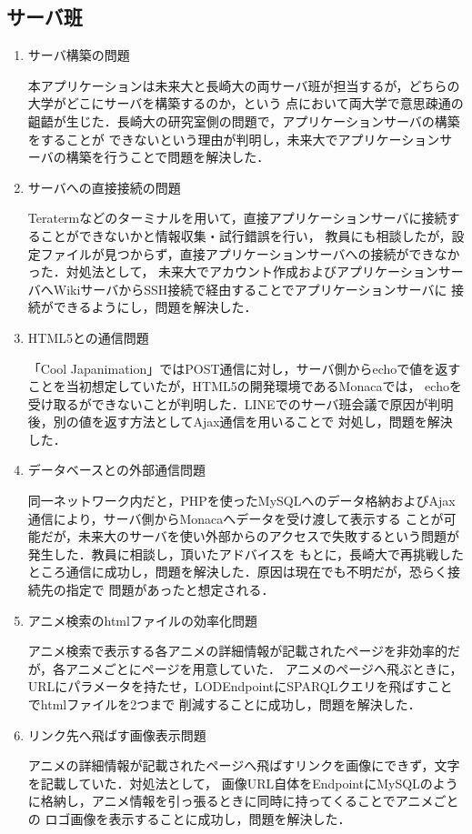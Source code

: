 \subsection{サーバ班}
\begin{enumerate}

\item サーバ構築の問題
\par
本アプリケーションは未来大と長崎大の両サーバ班が担当するが，どちらの大学がどこにサーバを構築するのか，という
点において両大学で意思疎通の齟齬が生じた．長崎大の研究室側の問題で，アプリケーションサーバの構築をすることが
できないという理由が判明し，未来大でアプリケーションサーバの構築を行うことで問題を解決した．

\item サーバへの直接接続の問題
\par
Teratermなどのターミナルを用いて，直接アプリケーションサーバに接続することができないかと情報収集・試行錯誤を行い，
教員にも相談したが，設定ファイルが見つからず，直接アプリケーションサーバへの接続ができなかった．対処法として，
未来大でアカウント作成およびアプリケーションサーバへWikiサーバからSSH接続で経由することでアプリケーションサーバに
接続ができるようにし，問題を解決した．

\item HTML5との通信問題
\par
「Cool Japanimation」ではPOST通信に対し，サーバ側からechoで値を返すことを当初想定していたが，HTML5の開発環境であるMonacaでは，
echoを受け取るができないことが判明した．LINEでのサーバ班会議で原因が判明後，別の値を返す方法としてAjax通信を用いることで
対処し，問題を解決した．

\item データベースとの外部通信問題
\par
同一ネットワーク内だと，PHPを使ったMySQLへのデータ格納およびAjax通信により，サーバ側からMonacaへデータを受け渡して表示する
ことが可能だが，未来大のサーバを使い外部からのアクセスで失敗するという問題が発生した．教員に相談し，頂いたアドバイスを
もとに，長崎大で再挑戦したところ通信に成功し，問題を解決した．原因は現在でも不明だが，恐らく接続先の指定で
問題があったと想定される．

\item アニメ検索のhtmlファイルの効率化問題
\par
アニメ検索で表示する各アニメの詳細情報が記載されたページを非効率的だが，各アニメごとにページを用意していた．
アニメのページへ飛ぶときに，URLにパラメータを持たせ，LODEndpointにSPARQLクエリを飛ばすことでhtmlファイルを2つまで
削減することに成功し，問題を解決した．

\item リンク先へ飛ばす画像表示問題
\par
アニメの詳細情報が記載されたページへ飛ばすリンクを画像にできず，文字を記載していた．対処法として，
画像URL自体をEndpointにMySQLのように格納し，アニメ情報を引っ張るときに同時に持ってくることでアニメごとの
ロゴ画像を表示することに成功し，問題を解決した．

\end{enumerate}

